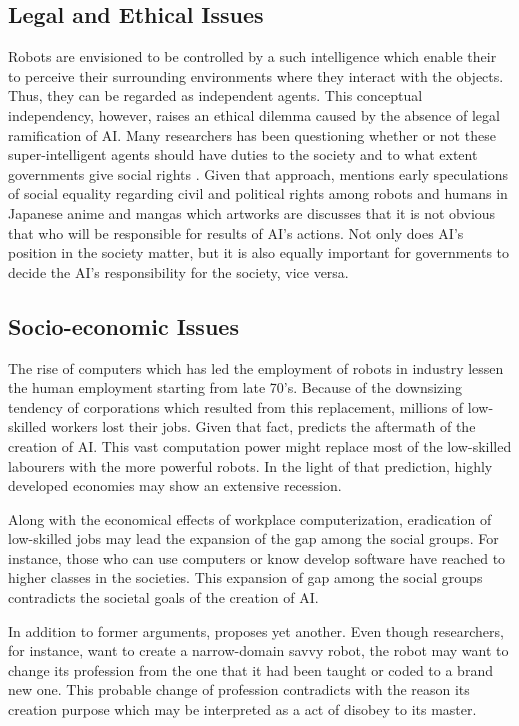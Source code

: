 \documentclass[man]{apa6}
\begin{document}

 
\subsection{Legal and Ethical Issues}
Robots are envisioned to be controlled by a such intelligence which enable their to perceive their surrounding environments where they interact with the objects. Thus, they can be regarded as independent agents.
This conceptual independency, however, raises an ethical dilemma caused by the absence of legal ramification of AI.
Many researchers has been questioning whether or not these super-intelligent agents should have duties to the society and to what extent governments give social rights \cite{bob}.
Given that approach, \cite{kerb} mentions early speculations of social equality regarding civil and political rights among robots and humans in Japanese anime and mangas which artworks are %
 discusses that it is not obvious that who will be responsible for results of AI's actions.
Not only does AI's position in the society matter, but it is also equally important for governments to decide the AI's responsibility for the society, vice versa.

\subsection{Socio-economic Issues}
The rise of computers which has led the employment of robots in industry lessen the human employment starting from late 70's.
Because of the downsizing tendency of corporations which resulted from this replacement, millions of low-skilled workers lost their jobs.
Given that fact,  predicts the aftermath of the creation of AI.
This vast computation power might replace most of the low-skilled labourers with the more powerful robots.
In the light of that prediction, highly developed economies may show an extensive recession. \par
Along with the economical effects of workplace computerization, eradication of low-skilled jobs may lead the expansion of the gap among the social groups.
For instance, those who can use computers or know develop software have reached to higher classes in the societies.
This expansion of gap among the social groups contradicts the societal goals of the creation of AI. \par
In addition to former arguments,  proposes yet another.
Even though researchers, for instance, want to create a narrow-domain savvy robot, the robot may want to change its profession from the one that it had been taught or coded to a brand new one.
This probable change of profession contradicts with the reason its creation purpose which may be interpreted as a act of disobey to its master.
\end{document}

